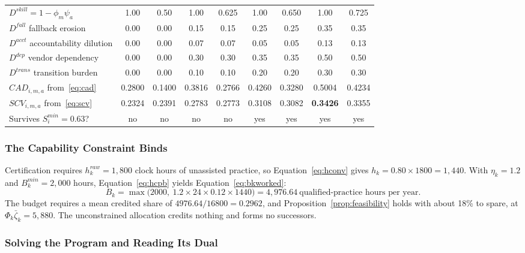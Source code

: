 \documentclass[utf8]{FrontiersinHarvard}
\begin{document}
\begin{table}[!htbp]
\begin{tabularx}{\textwidth}{@{}Xcccccccc@{}}
			$D^{skill}=1-\phi_m\psi_a$ & 1.00 & 0.50 & 1.00 & 0.625 & 1.00 & 0.650 & 1.00 & 0.725\\
			$D^{fall}$ fallback erosion & 0.00 & 0.00 & 0.15 & 0.15 & 0.25 & 0.25 & 0.35 & 0.35\\
			$D^{acct}$ accountability dilution & 0.00 & 0.00 & 0.07 & 0.07 & 0.05 & 0.05 & 0.13 & 0.13\\
			$D^{dep}$ vendor dependency & 0.00 & 0.00 & 0.30 & 0.30 & 0.35 & 0.35 & 0.50 & 0.50\\
			$D^{trans}$ transition burden & 0.00 & 0.00 & 0.10 & 0.10 & 0.20 & 0.20 & 0.30 & 0.30\\
			\midrule
			$CAD_{i,m,a}$ from~\eqref{eq:cad} & 0.2800 & 0.1400 & 0.3816 & 0.2766 & 0.4260 & 0.3280 & 0.5004 & 0.4234\\
			$SCV_{i,m,a}$ from~\eqref{eq:scv} & 0.2324 & 0.2391 & 0.2783 & 0.2773 & 0.3108 & 0.3082 & \textbf{0.3426} & 0.3355\\
			\midrule
			Survives $S^{min}_i=0.63$? & no & no & no & no & yes & yes & yes & yes\\
			\bottomrule
		\end{tabularx}
	\end{table}

	\subsubsection*{The Capability Constraint Binds}
	\label{sec:binds}

	Certification requires $h^{raw}_k=1{,}800$ clock hours of unassisted practice, so Equation~\eqref{eq:hconv} gives $h_k=0.80\times1800=1{,}440$. With $\eta_k=1.2$ and $B_k^{min}=2{,}000$ hours, Equation~\eqref{eq:hcpb} yields Equation~\eqref{eq:bkworked}:
	\begin{equation}
		B_k = \max\bigl(2000,\ 1.2 \times 24 \times 0.12 \times 1440\bigr) = 4{,}976.64 \ \text{qualified-practice hours per year}.
		\label{eq:bkworked}
	\end{equation}
	The budget requires a mean credited share of $4976.64/16800=0.2962$, and Proposition~\ref{prop:feasibility} holds with about 18\% to spare, at $\Phi_k\bar\zeta_k=5{,}880$. The unconstrained allocation credits nothing and forms no successors.

	\subsubsection*{Solving the Program and Reading Its Dual}
	\label{sec:solving}
\end{document}
